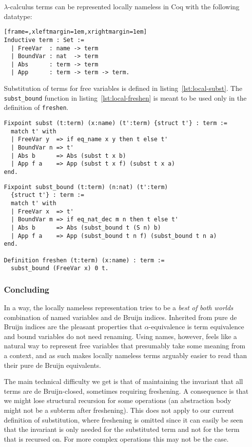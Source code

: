 \documentclass[a4paper,11pt]{article}
\begin{document}
$\lambda$-calculus terms can be represented locally nameless in Coq with
the following datatype:
\begin{lstlisting}[frame=,xleftmargin=1em,xrightmargin=1em]
Inductive term : Set :=
  | FreeVar  : name -> term
  | BoundVar : nat  -> term
  | Abs      : term -> term
  | App      : term -> term -> term.
\end{lstlisting}
Substitution of terms for free variables is defined in
listing~\ref{lst:local-subst}.
The \lstinline{subst_bound} function in listing~\ref{lst:local-freshen}
is meant to be used only in the definition of \lstinline{freshen}.
\begin{lstlisting}[float,caption={{\small \em (Locally nameless)} Substitution},label=lst:local-subst]
Fixpoint subst (t:term) (x:name) (t':term) {struct t'} : term :=
  match t' with
  | FreeVar y  => if eq_name x y then t else t'
  | BoundVar n => t'
  | Abs b      => Abs (subst t x b)
  | App f a    => App (subst t x f) (subst t x a)
end.
\end{lstlisting}
\begin{lstlisting}[float,caption={{\small \em (Locally nameless)} Freshening},label=lst:local-freshen]
Fixpoint subst_bound (t:term) (n:nat) (t':term)
  {struct t'} : term :=
  match t' with
  | FreeVar x  => t'
  | BoundVar m => if eq_nat_dec m n then t else t'
  | Abs b      => Abs (subst_bound t (S n) b)
  | App f a    => App (subst_bound t n f) (subst_bound t n a)
end.

Definition freshen (t:term) (x:name) : term :=
  subst_bound (FreeVar x) 0 t.
\end{lstlisting}

\subsubsection*{Concluding}

In a way, the locally nameless representation tries to be a
\emph{best of both worlds} combination of named variables and de Bruijn
indices.
Inherited from pure de Bruijn indices are the pleasant properties that
$\alpha$-equivalence is term equivalence and bound variables do not need
renaming.
Using names, however, feels like a natural way to represent free
variables that presumably take some meaning from a context, and as such
makes locally nameless terms arguably easier to read than their pure de
Bruijn equivalents.

The main technical difficulty we get is that of maintaining the invariant
that all terms are de Bruijn-closed, sometimes requiring freshening.
A consequence is that we might lose structural recursion for some
operations (an abstraction body might not be a subterm after freshening).
This does not apply to our current definition of substitution, where
freshening is omitted since it can easily be seen that the invariant is
only needed for the substituted term and not for the term that is recursed
on.
For more complex operations this may not be the case.
\end{document}
